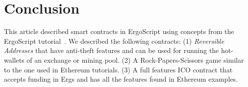 \documentclass[11pt]{article}
\newcommand{\langname}{ErgoScript\xspace}
\begin{document}


\section{Conclusion}

This article described smart contracts in \langname using concepts from the \langname tutorial~\cite{whitepaper}.
We described the following contracts: (1) {\em Reversible Addresses} that have anti-theft features and can be used for running the hot-wallets of an exchange or mining pool. (2) A Rock-Papers-Scissors game similar to the one used in Ethereum tutorials. (3) A full features ICO contract that accepts funding in Ergs and has all the features found in Ethereum examples.



\end{document}
